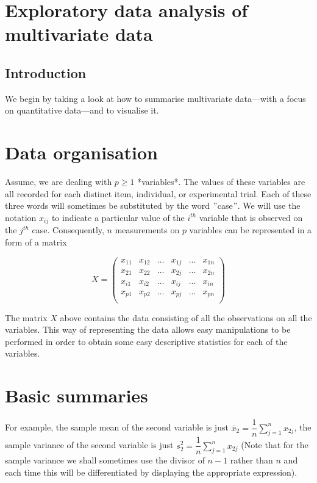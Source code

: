 \documentclass[11pt]{article}
\begin{document}
\section{Exploratory data analysis of multivariate data}\label{sec:exploratory-data-analysis-of-multivariate-data}

\subsection{Introduction}\label{subsec:introduction}
We begin by taking a look at how to summarise multivariate data—with a focus on
quantitative data—and to visualise it.

\section{Data organisation}\label{sec:data-organisation}
Assume, we are dealing with $p \geq 1$ *variables*.
The values of these variables are all recorded for each distinct item,
individual, or experimental trial.
Each of these three words will sometimes be substituted by the word
\("\)case\("\).
We will use the notation $x_{ij}$ to indicate a particular value of the
$i^{th}$ variable that is observed on the $j^{th}$ case.
Consequently, $n$ measurements on $p$ variables can be represented in a form
of a matrix

\[
X =
\begin{pmatrix}
x_{11} & x_{12} & \dots & x_{1j} & \dots & x_{1n} \\
x_{21} & x_{22} & \dots & x_{2j} & \dots & x_{2n} \\
x_{i1} & x_{i2} & \dots & x_{ij} & \dots & x_{in} \\
x_{p1} & x_{p2} & \dots & x_{pj} & \dots & x_{pn} \\
\end{pmatrix}
\]

The matrix $X$ above contains the data consisting of all the observations on
all the variables.
This way of representing the data allows easy manipulations
to be performed in order to obtain some easy descriptive statistics for each
of the variables.

\section{Basic summaries}\label{sec:basic-summaries}
For example, the sample mean of the second variable is just $\bar{x}_2 = \dfrac{1}{n} \sum_{j=1}^{n} x_{2j}$,
the sample variance of the second variable is just $s_2^2 = \dfrac{1}{n}\sum_{j=1}^{n} x_{2j}$
(Note that for the sample variance we shall sometimes use the divisor of $n - 1$
rather than $n$ and each time this will be differentiated by displaying the
appropriate expression).
\end{document}
